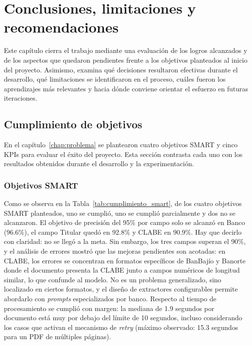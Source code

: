 \chapter{Conclusiones, limitaciones y recomendaciones}\label{chap:conclusiones}

Este capítulo cierra el trabajo mediante una evaluación de los logros alcanzados y de los aspectos que quedaron pendientes frente a los objetivos planteados al inicio del proyecto. Asimismo, examina qué decisiones resultaron efectivas durante el desarrollo, qué limitaciones se identificaron en el proceso, cuáles fueron los aprendizajes más relevantes y hacia dónde conviene orientar el esfuerzo en futuras iteraciones.

\section{Cumplimiento de objetivos}

En el capítulo~\ref{chap:problema} se plantearon cuatro objetivos SMART y cinco KPIs para evaluar el éxito del proyecto. Esta sección contrasta cada uno con los resultados obtenidos durante el desarrollo y la experimentación.

\subsection{Objetivos SMART}

Como se observa en la Tabla~\ref{tab:cumplimiento_smart}, de los cuatro objetivos SMART planteados, uno se cumplió, uno se cumplió parcialmente y dos no se alcanzaron. El objetivo de precisión del 95\% por campo solo se alcanzó en Banco (96.6\%), el campo Titular quedó en 92.8\% y CLABE en 90.9\%. Hay que decirlo con claridad: no se llegó a la meta. Sin embargo, los tres campos superan el 90\%, y el análisis de errores mostró que las mejoras pendientes son acotadas: en CLABE, los errores se concentran en formatos específicos de BanBajío y Banorte donde el documento presenta la CLABE junto a campos numéricos de longitud similar, lo que confunde al modelo. No es un problema generalizado, sino localizado en ciertos formatos, y el diseño de extractores configurables permite abordarlo con \textit{prompts} especializados por banco. Respecto al tiempo de procesamiento se cumplió con margen: la mediana de 1.9 segundos por documento está muy por debajo del límite de 10 segundos, incluso considerando los casos que activan el mecanismo de \textit{retry} (máximo observado: 15.3 segundos para un PDF de múltiples páginas).

